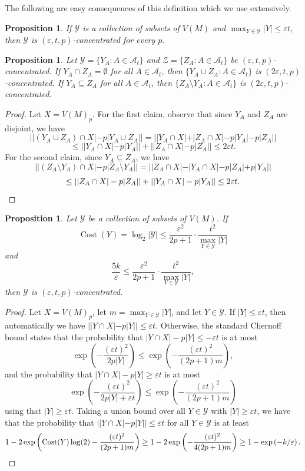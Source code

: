 \documentclass[12pt]{article}
\newcommand{\ep}{\varepsilon}
\newcommand{\A}{\mathcal{A}}
\newcommand{\Y}{\mathcal{Y}}
\newcommand{\Z}{\mathcal{Z}}
\DeclareMathOperator{\cost}{Cost}
\newtheorem{proposition}[theorem]{Proposition}
\begin{document}
The following are easy consequences of this definition which we use extensively.
\begin{proposition}\label{prop::autoconc}
If $\Y$ is a collection of subsets of $V(M)$ and $\max_{Y \in \Y} |Y| \leq \ep t$, then $\Y$ is $(\ep,t,p)$-concentrated for every $p$.
\end{proposition}

\begin{proposition}\label{prop::unionconc}
Let $\Y = \{Y_A : A \in \A_t\}$ and $\Z = \{Z_A : A \in \A_t\}$ be $(\ep,t,p)$-concentrated. If $Y_A \cap Z_A = \emptyset$ for all $A \in \A_t$, then $\{Y_A \cup Z_A : A \in \A_t\}$ is $(2\ep,t,p)$-concentrated. If $Y_A \subseteq Z_A$ for all $A \in \A_t$, then $\{Z_A \setminus Y_A : A \in \A_t\}$ is $(2\ep,t,p)$-concentrated.
\end{proposition}

\begin{proof}
Let $X = V(M)_p$. For the first claim, observe that since $Y_A$ and $Z_A$ are disjoint, we have
\[ ||(Y_A \cup Z_A) \cap X| - p|Y_A \cup Z_A|| = ||Y_A \cap X| + |Z_A \cap X| - p|Y_A| - p|Z_A|| \]
\[ \leq ||Y_A \cap X| - p|Y_A|| + ||Z_A \cap X| - p|Z_A|| \leq 2\ep t .\]
For the second claim, since $Y_A \subseteq Z_A$, we have
\[ ||(Z_A \setminus Y_A) \cap X| - p|Z_A \setminus Y_A|| = ||Z_A \cap X| - |Y_A \cap X| - p|Z_A| + p|Y_A|| \]
\[ \leq ||Z_A \cap X| - p|Z_A|| + ||Y_A \cap X| - p|Y_A|| \leq 2\ep t . \qedhere\]
\end{proof}

\begin{proposition}\label{prop::Chern}
Let $\Y$ be a collection of subsets of $V(M)$. If
\[ \cost(Y) = \log_2|\Y| \leq \frac{\ep^2}{2p+1} \cdot \frac{t^2}{\max_{Y \in \Y} |Y|} \]
and
\[ \frac{5k}{\ep} \leq \frac{\ep^2}{2p+1} \cdot \frac{t^2}{\max_{Y \in \Y} |Y|} ,\]
then $\Y$ is $(\ep,t,p)$-concentrated. 
\end{proposition}

\begin{proof}
Let $X = V(M)_p$, let $m = \max_{Y\in\Y} |Y|$, and let $Y \in \Y$. If $|Y| \leq \ep t$, then automatically we have $||Y \cap X| - p|Y|| \leq \ep t$. Otherwise, the standard Chernoff bound states that the probability that $|Y \cap X| - p|Y| \leq -\ep t$ is at most
\[ \exp\left( - \frac{(\ep t)^2}{2p|Y|} \right) \leq \exp\left( - \frac{(\ep t)^2}{(2p+1)m} \right) ,\]
and the probability that $|Y \cap X| - p|Y| \geq \ep t$ is at most
\[ \exp\left( - \frac{(\ep t)^2}{2p|Y|+\ep t} \right) \leq \exp\left( - \frac{(\ep t)^2}{(2p+1)m} \right) \]
using that $|Y| \geq \ep t$. Taking a union bound over all $Y \in \Y$ with $|Y| \geq \ep t$, we have that the probability that $||Y \cap X| - p|Y|| \leq \ep t$ for all $Y \in \Y$ is at least
\[ 1 - 2 \exp\left( \cost(Y) \log(2) - \frac{(\ep t)^2}{(2p+1)m} \right) \geq 1 - 2 \exp\left( - \frac{(\ep t)^2}{4(2p+1)m} \right) \geq 1 - \exp\left( - k/\ep \right) . \qedhere\]
\end{proof}
\end{document}
